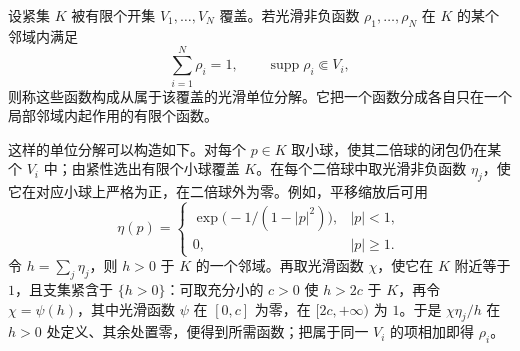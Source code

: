 \begin{definition}
设紧集 $K$ 被有限个开集 $V_1,\ldots,V_N$ 覆盖。若光滑非负函数 $\rho_1,\ldots,\rho_N$ 在 $K$ 的某个邻域内满足
\[
\sum_{i=1}^N\rho_i=1,\qquad \operatorname{supp}\rho_i\Subset V_i,
\]
则称这些函数构成从属于该覆盖的光滑单位分解。它把一个函数分成各自只在一个局部邻域内起作用的有限个函数。
\end{definition}
这样的单位分解可以构造如下。对每个 $p\in K$ 取小球，使其二倍球的闭包仍在某个 $V_i$ 中；由紧性选出有限个小球覆盖 $K$。在每个二倍球中取光滑非负函数 $\eta_j$，使它在对应小球上严格为正，在二倍球外为零。例如，平移缩放后可用
\[
\eta(p)=
\begin{cases}
\exp\bigl(-1/(1-|p|^2)\bigr),&|p|<1,\\
0,&|p|\ge1.
\end{cases}
\]
令 $h=\sum_j\eta_j$，则 $h>0$ 于 $K$ 的一个邻域。再取光滑函数 $\chi$，使它在 $K$ 附近等于 $1$，且支集紧含于 $\{h>0\}$：可取充分小的 $c>0$ 使 $h>2c$ 于 $K$，再令 $\chi=\psi(h)$，其中光滑函数 $\psi$ 在 $[0,c]$ 为零，在 $[2c,+\infty)$ 为 $1$。于是 $\chi\eta_j/h$ 在 $h>0$ 处定义、其余处置零，便得到所需函数；把属于同一 $V_i$ 的项相加即得 $\rho_i$。

